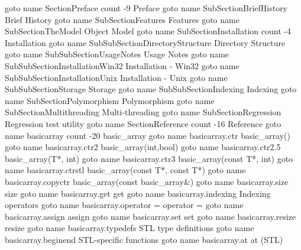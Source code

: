 \documentclass[12pt,letterpaper]{article}
\begin{document}
\pdfoutline goto name {SectionPreface} count -9 {Preface}
    \pdfoutline goto name {SubSectionBriefHistory} {Brief History}
    \pdfoutline goto name {SubSectionFeatures} {Features}
    \pdfoutline goto name {SubSectionTheModel}     {Object Model}
    \pdfoutline goto name {SubSectionInstallation} count -4 {Installation}
        \pdfoutline goto name {SubSubSectionDirectoryStructure} {Directory Structure}
        \pdfoutline goto name {SubSubSectionUsageNotes}         {Usage Notes}
        \pdfoutline goto name {SubSubSectionInstallationWin32}  {Installation - Win32}
        \pdfoutline goto name {SubSubSectionInstallationUnix}   {Installation - Unix}
    \pdfoutline goto name {SubSubSectionStorage}            {Storage}
    \pdfoutline goto name {SubSubSectionIndexing}           {Indexing}
    \pdfoutline goto name {SubSectionPolymorphism}          {Polymorphism}
    \pdfoutline goto name {SubSectionMultithreading}        {Multi-threading}
    \pdfoutline goto name {SubSectionRegression}            {Regression test utility}
\pdfoutline goto name {SectionReference} count -16 {Reference}
    \pdfoutline goto name {basicarray} count -20 {basic_array}
        \pdfoutline goto name {basicarray.ctr}                  {basic_array()}
        \pdfoutline goto name {basicarray.ctr2}                 {basic_array(int,bool)}
        \pdfoutline goto name {basicarray.ctr2.5}               {basic_array(T*, int)}
        \pdfoutline goto name {basicarray.ctr3}                 {basic_array(const T*, int)}
        \pdfoutline goto name {basicarray.ctrstl}               {basic_array(const T*, const T*)}
        \pdfoutline goto name {basicarray.copyctr}              {basic_array(const basic_array&)}
        \pdfoutline goto name {basicarray.size}                 {size}
        \pdfoutline goto name {basicarray.get}                  {get}
        \pdfoutline goto name {basicarray.indexing}             {Indexing operators}
        \pdfoutline goto name {basicarray.operator =}           {operator =}
        \pdfoutline goto name {basicarray.assign}               {assign}
        \pdfoutline goto name {basicarray.set}                  {set}
        \pdfoutline goto name {basicarray.resize}               {resize}
        \pdfoutline goto name {basicarray.typedefs}             {STL type definitions}
        \pdfoutline goto name {basicarray.beginend}             {STL-specific functions}
        \pdfoutline goto name {basicarray.at}                   {at (STL)}
\end{document}
